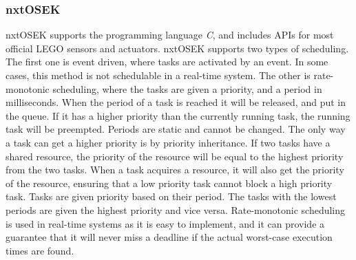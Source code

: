 
\subsubsection{nxtOSEK}
nxtOSEK supports the programming language \emph{C}, and includes APIs for most official LEGO sensors and actuators. nxtOSEK supports two types of scheduling. The first one is event driven, where tasks are activated by an event. In some cases, this method is not schedulable in a real-time system. The other is rate-monotonic scheduling, where the tasks are given a priority, and a period in milliseconds. When the period of a task is reached it will be released, and put in the queue. If it has a higher priority than the currently running task, the running task will be preempted. Periods are static and cannot be changed. The only way a task can get a higher priority is by priority inheritance. If two tasks have a shared resource, the priority of the resource will be equal to the highest priority from the two tasks. When a task acquires a resource, it will also get the priority of the resource, ensuring that a low priority task cannot block a high priority task. Tasks are given priority based on their period. The tasks with the lowest periods are given the highest priority and vice versa. Rate-monotonic scheduling is used in real-time systems as it is easy to implement, and it can provide a guarantee that it will never miss a deadline if the actual worst-case execution times are found. 




